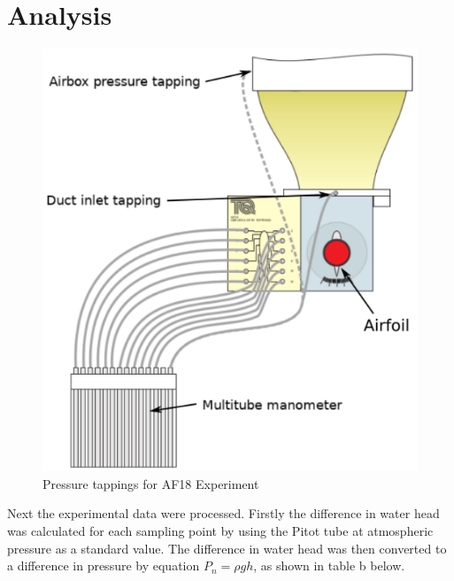 \section{Analysis}
\FloatBarrier %

\begin{figure}[htb] %
    \centering
    \includegraphics[scale=0.45]{fig/AF18.png}
    \caption{Pressure tappings for AF18 Experiment}
    \label{demo}
\end{figure}


Next the experimental data were processed. Firstly the difference in water head was calculated for each sampling point by using the Pitot tube at atmospheric pressure as a standard value. The difference in water head was then converted to a difference in pressure by equation $P_n=\rho gh$, as shown in table b below.



